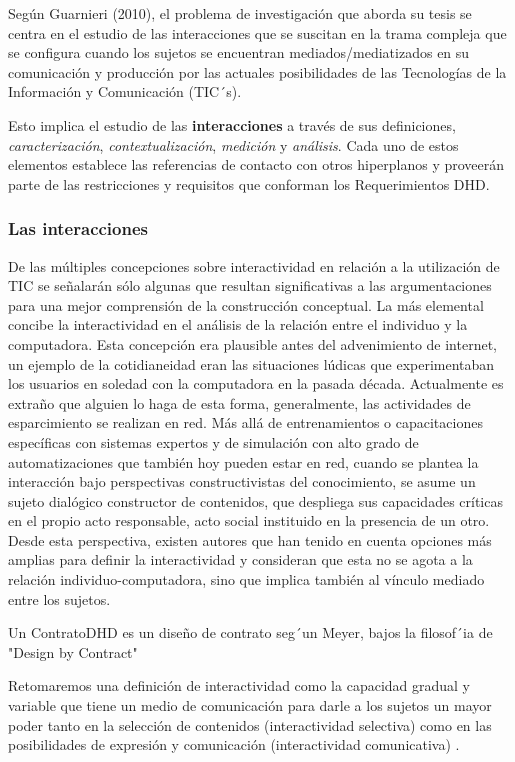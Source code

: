 Según Guarnieri (2010), el problema de investigación que aborda su tesis se centra en el estudio de las
interacciones que se suscitan en la trama compleja que se configura cuando los
sujetos se encuentran mediados/mediatizados en su comunicación y producción por
las actuales posibilidades de las Tecnologías de la Información y Comunicación
(TIC´s). 

Esto implica el estudio de las \textbf{interacciones} a través de sus definiciones,
\textit{caracterización}, \textit{contextualización}, \textit{medición} y
\textit{análisis}. Cada uno de estos elementos establece las referencias de
contacto con otros hiperplanos y proveerán parte de las restricciones y
requisitos que conforman los Requerimientos DHD.

\subsubsection{Las interacciones} \label{relaciones}

De las múltiples concepciones sobre interactividad en relación a la utilización de TIC se señalarán sólo algunas que resultan significativas a las argumentaciones para una mejor comprensión de la construcción conceptual.
La más elemental concibe la interactividad en el análisis de la relación entre el individuo y la computadora. Esta
concepción era plausible antes del advenimiento de internet,
un ejemplo de la cotidianeidad eran las situaciones lúdicas que experimentaban los usuarios en soledad con la
computadora en la pasada década. Actualmente es extraño que alguien lo haga de esta forma,
generalmente, las actividades de esparcimiento se realizan en red. Más allá de
entrenamientos o capacitaciones específicas con sistemas expertos y de
simulación con alto grado de automatizaciones que también hoy pueden estar en
red, cuando se plantea la interacción bajo perspectivas constructivistas del
conocimiento, se asume un sujeto dialógico constructor de contenidos, que
despliega sus capacidades críticas en el propio acto responsable, acto social instituido en la presencia de un otro.
Desde esta perspectiva, existen autores que han tenido en cuenta opciones más amplias para
definir la interactividad y consideran que esta no se agota a la relación
individuo-computadora, sino que implica también al vínculo mediado entre los
sujetos. 

\begin{defi} [ContratoDHD]

Un ContratoDHD es un dise\~no de contrato seg´un Meyer, bajos la filosof´ia de
"Design by Contract"


Retomaremos una definición de interactividad como la capacidad gradual y
variable que tiene un medio de comunicación para darle a los sujetos
un mayor poder tanto en la selección de contenidos (interactividad selectiva)
como en las posibilidades de expresión y comunicación (interactividad
comunicativa) \cite{lxxiv}.
\end{defi} 

